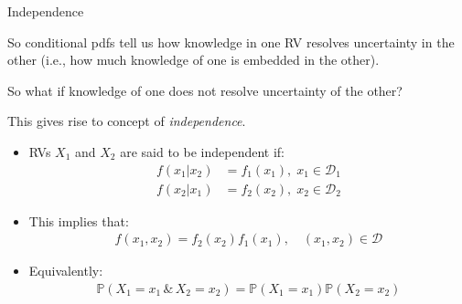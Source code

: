 \documentclass[9pt]{beamer}
\begin{document}
%
\begin{frame}{Independence}

So conditional pdfs tell us how knowledge in one RV resolves uncertainty in the other (i.e., how much knowledge of one is embedded in the other). 
\begin{block}{}
So what if knowledge of one does not resolve uncertainty of the other? 
\end{block}
This gives rise to concept of {\em independence}.

\begin{itemize}
\setlength{\itemsep}{10pt}
\item RVs $X_1$ and $X_2$ are said to be independent if:
\begin{align*}
f(x_1|x_2)&=f_1(x_1),\; x_1\in \mathcal{D}_1\\
f(x_2|x_1)&=f_2(x_2),\; x_2\in \mathcal{D}_2
\end{align*}
\item This implies that:
 \begin{align*}
{f(x_1,x_2)}={f_2(x_2)}f_1(x_1),\quad (x_1,x_2)\in \mathcal{D}
\end{align*}
\item Equivalently:
 \begin{align*}
\mathbb{P}(X_1=x_1\,\&\,X_2=x_2)=\mathbb{P}(X_1=x_1)\mathbb{P}(X_2=x_2)
\end{align*}

\end{itemize}

\end{frame}
\end{document}
